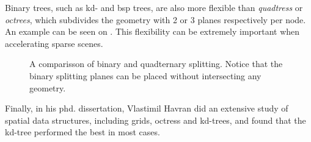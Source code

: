 Binary trees, such as kd- and bsp trees, are also more flexible than
\textit{quadtress} or \textit{octrees}, which subdivides the geometry
with 2 or 3 planes respectively per node. An example can be seen on
. This flexibility can be extremely important
when accelerating sparse scenes.


\begin{figure}
  \centering
  \hspace{20pt}

  \parbox{9cm}{\caption[Comparisson of binary and quadternary
      splitting]{A comparisson of binary and quadternary
      splitting. Notice that the binary splitting planes can be placed
      without intersecting any geometry.}\label{fig:binQuadSplit}}
\end{figure}


Finally, in his phd. dissertation, Vlastimil Havran did an extensive
study of spatial data structures, including grids, octress and
kd-trees, and found that the kd-tree performed the best in most cases.

